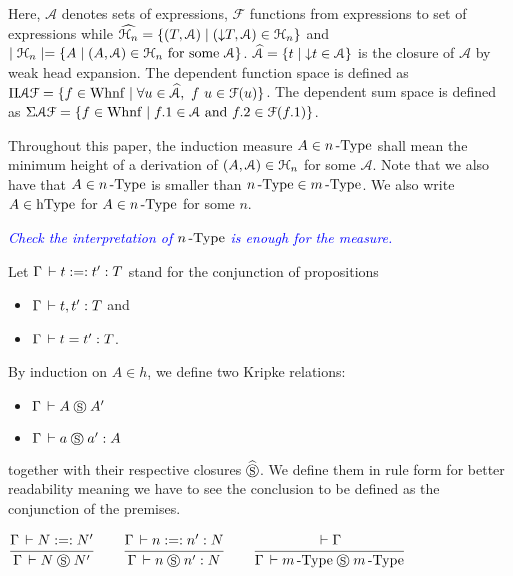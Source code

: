 \documentclass[a4paper,english]{lipics-utf8x}
\newcommand\meta[1]{\noindent\textcolor{blue}{\emph{#1}}}
\begin{document}
  \noindent %
  Here, $\mathcal{A}$ denotes sets of expressions, $\mathcal{F}$ functions from
  expressions to set of expressions while
  $\widehat{\mathcal{H}_n} = \{ (T,\mathcal{A}) \mid ({\downarrow} T, \mathcal{A}) \in \mathcal{H}_n \}$
  and $\mid \mathcal{H}_n \mid = \{ A \mid (A, \mathcal{A}) \in \mathcal{H}_n \text{ for some }
  \mathcal{A} \}$.
  $\widehat{\mathcal{A}} = \{ t \mid {\downarrow} t \in \mathcal{A} \}$ is the closure
  of $\mathcal{A}$ by weak head expansion.
  The dependent function space is defined as
  $\Pi \mathcal{A} \mathcal{F} = \{ f \in \operatorname{Whnf} \mid \forall u \in
  \widehat{\mathcal{A}},\ f~u \in \mathcal{F}(u) \}$.
  The dependent sum space is defined as
  $\Sigma \mathcal{A} \mathcal{F} = \{ f \in \operatorname{Whnf} \mid f.1 \in \mathcal{A}
  \text{ and } f.2 \in \mathcal{F}(f.1) \}$.

  Throughout this paper, the induction measure $A \in n\operatorname{-Type}$ shall mean the
  minimum height of a derivation of $(A, \mathcal{A}) \in \mathcal{H}_n$ for some
  $\mathcal{A}$.
  Note that we also have that $A \in n\operatorname{-Type}$ is smaller than
  $n\operatorname{-Type} \in m\operatorname{-Type}$.
  We also write $A \in \operatorname{hType}$ for $A \in n\operatorname{-Type}$ for some $n$.

  \meta{Check the interpretation of $n\operatorname{-Type}$ is enough for the measure.}

  Let $\Gamma \,\vdash t :=: t' : T$ stand for the conjunction of propositions
  \begin{itemize}
    \item $\Gamma \,\vdash t,t' : T$ and
    \item $\Gamma \,\vdash t = t' : T$.
  \end{itemize}
  By induction on $A \in h$, we define two Kripke relations:
  \begin{itemize}
    \item $\Gamma \,\vdash A \mathrel{\circledS} A'$
    \item $\Gamma \,\vdash a \mathrel{\circledS} a' : A$
  \end{itemize}
  together with their respective closures $\mathrel{\widehat{\mathrel{\circledS}}}$.
  We define them in rule form for better readability meaning we have to see the
  conclusion to be defined as the conjunction of the premises.

  \begin{center}
  \(
    \ru{\Gamma \der N :=: N'
      }{\Gamma \der N \Sr N'}
    \qquad
    \ru{\Gamma \der n :=: n' : N
      }{\Gamma \der n \Sr n' : N}
    \qquad
    \ru{\der \Gamma
      }{\Gamma \der \nType{m} \Sr \nType{m}}
  \)
  \end{center}
\end{document}
